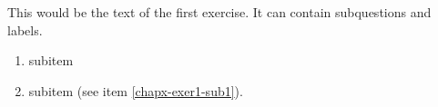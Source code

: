 This would be the text of the first exercise. It can contain subquestions and labels. 
\begin{enumerate}
\item{subitem\label{chapx-exer1-sub1}}
\item{subitem (see item \ref{chapx-exer1-sub1}).\label{chapx-exer1-sub2}}
\end{enumerate}